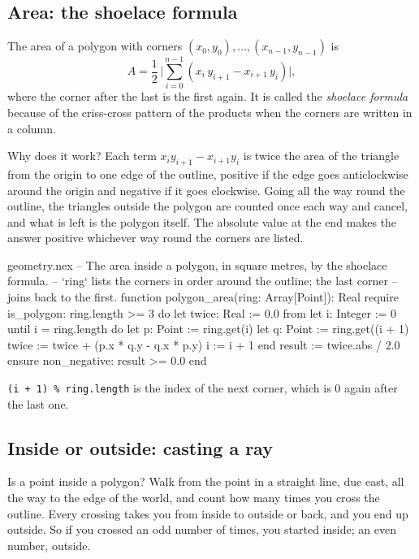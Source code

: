 \subsection{Area: the shoelace formula}

The area of a polygon with corners $(x_0, y_0), \dots, (x_{n-1}, y_{n-1})$ is
\[
  A = \frac{1}{2}\,\Big|\sum_{i=0}^{n-1} (x_i\, y_{i+1} - x_{i+1}\, y_i)\Big|,
\]
where the corner after the last is the first again. It is called the
\emph{shoelace formula} because of the criss-cross pattern of the products
when the corners are written in a column.

Why does it work? Each term $x_i y_{i+1} - x_{i+1} y_i$ is twice the area
of the triangle from the origin to one edge of the outline, positive if
the edge goes anticlockwise around the origin and negative if it goes
clockwise. Going all the way round the outline, the triangles outside the
polygon are counted once each way and cancel, and what is left is the
polygon itself. The absolute value at the end makes the answer positive
whichever way round the corners are listed.

\begin{append}{geometry.nex}
-- The area inside a polygon, in square metres, by the shoelace formula.
-- `ring` lists the corners in order around the outline; the last corner
-- joins back to the first.
function polygon_area(ring: Array[Point]): Real
require
  is_polygon: ring.length >= 3
do
  let twice: Real := 0.0
  from
    let i: Integer := 0
  until
    i = ring.length
  do
    let p: Point := ring.get(i)
    let q: Point := ring.get((i + 1) %
    twice := twice + (p.x * q.y - q.x * p.y)
    i := i + 1
  end
  result := twice.abs / 2.0
ensure
  non_negative: result >= 0.0
end
\end{append}

\texttt{(i + 1) \% ring.length} is the index of the next corner, which is
0 again after the last one.

\subsection{Inside or outside: casting a ray}

Is a point inside a polygon? Walk from the point in a straight line,
due east, all the way to the edge of the world, and count how many times
you cross the outline. Every crossing takes you from inside to outside or
back, and you end up outside. So if you crossed an odd number of times, you
started inside; an even number, outside.

